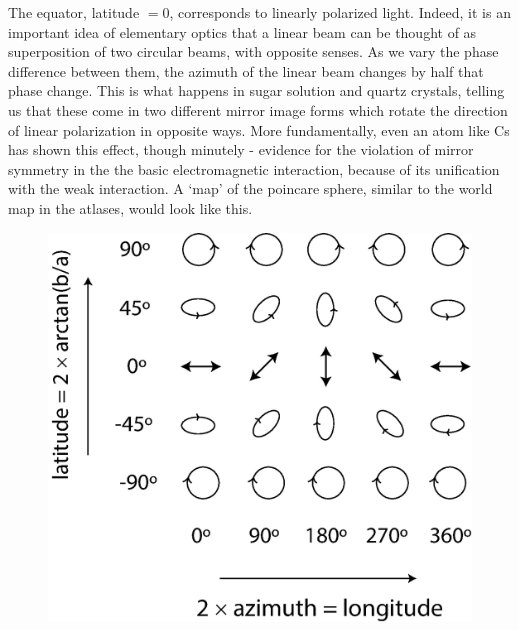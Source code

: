 The equator, latitude $= 0$, corresponds to linearly polarized light. Indeed,
it is an important idea of elementary optics that a linear beam can be thought
of as superposition of two circular beams, with opposite senses. As we vary the
phase difference between them, the azimuth of the linear beam changes by half
that phase change. This is what happens in sugar solution and quartz crystals,
telling us that these come in two different mirror image forms which rotate the
direction of linear polarization in opposite ways. More fundamentally, even an
atom like Cs has shown this effect, though minutely - evidence for the violation
of mirror symmetry in the the basic electromagnetic interaction, because of its
unification with the weak interaction. A `map' of the poincare sphere, similar
to the world map in the atlases, would look like this.
\bigskip

\begin{figure}[H]
\centering
\includegraphics[scale=0.18]{src/images/chap26/6.jpg}
\end{figure}

